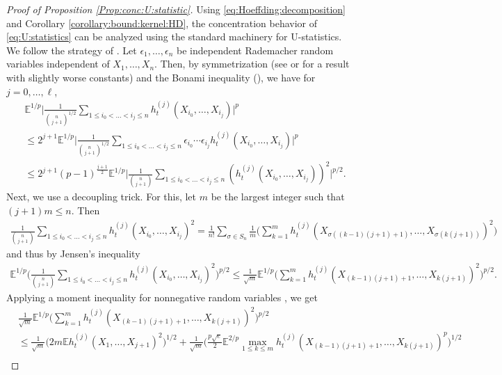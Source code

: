 \documentclass[10pt]{article}
\theoremstyle{plain}
\theoremstyle{definition}
\theoremstyle{remark}
\begin{document}
\begin{proof}[Proof of Proposition \ref{Prop:conc:U:statistic}]
    Using \eqref{eq:Hoeffding:decomposition} and Corollary \ref{corollary:bound:kernel:HD}, the concentration behavior of \eqref{eq:U:statistics} can be analyzed using the standard machinery for U-statistics. We follow the strategy of \cite{Mins24}. Let $\epsilon_1,\dots,\epsilon_n$ be independent Rademacher random variables independent of $X_1,\dots,X_n$. Then, by symmetrization (see \cite{SCK19} or \cite[Theorem 3.1]{PG99} for a result with slightly worse constants) and the Bonami inequality (\cite[Theorem 3.22]{PG99}), we have for $j=0,\dots,\ell$, 
    \begin{align*}
        &\mathbb{E}^{1/p}\Big|\frac{1}{\binom{n}{j+1}^{1/2}}\sum_{1\leq i_0<\dots<i_j\leq n}h_t^{(j)}(X_{i_0},\dots,X_{i_j})\Big|^p\\
        &\leq 2^{j+1}\mathbb{E}^{1/p}\Big|\frac{1}{\binom{n}{j+1}^{1/2}}\sum_{1\leq i_0<\dots<i_j\leq n}\epsilon_{i_0}\cdots\epsilon_{i_j}h_t^{(j)}(X_{i_0},\dots,X_{i_j})\Big|^p\\
        &\leq 2^{j+1}(p-1)^{\frac{j+1}{2}}\mathbb{E}^{1/p}\Big|\frac{1}{\binom{n}{j+1}}\sum_{1\leq i_0<\dots<i_j\leq n}(h_t^{(j)}(X_{i_0},\dots,X_{i_j}))^2\Big|^{p/2}.
    \end{align*}
    Next, we use a decoupling trick. For this, let $m$ be the largest integer such that $(j+1)m\leq n$. Then 
    \begin{align*}
        \frac{1}{\binom{n}{j+1}}\sum_{1\leq i_0<\dots<i_j\leq n}h_t^{(j)}(X_{i_0},\dots,X_{i_j})^2=\frac{1}{n!}\sum_{\sigma\in S_n}\frac{1}{m}\Big(\sum_{k=1}^m h_t^{(j)}(X_{\sigma((k-1)(j+1)+1)},\dots,X_{\sigma(k(j+1))})^2\Big)
    \end{align*}
    and thus by Jensen's inequality 
    \begin{align*}
        \mathbb{E}^{1/p}\Big(\frac{1}{\binom{n}{j+1}}\sum_{1\leq i_0<\dots<i_j\leq n}h_t^{(j)}(X_{i_0},\dots,X_{i_j})^2\Big)^{p/2}\leq \frac{1}{\sqrt{m}}\mathbb{E}^{1/p}\Big(\sum_{k=1}^m h_t^{(j)}(X_{(k-1)(j+1)+1},\dots,X_{k(j+1)})^2\Big)^{p/2}.
    \end{align*}
    Applying a moment inequality for nonnegative random variables \cite[Theorem 15.10]{BLM13}, we get
    \begin{align*}
        &\frac{1}{\sqrt{m}}\mathbb{E}^{1/p}\Big(\sum_{k=1}^mh_t^{(j)}(X_{(k-1)(j+1)+1},\dots,X_{k(j+1)})^2\Big)^{p/2}\\
        & \leq \frac{1}{\sqrt{m}}\Big(2m\mathbb{E}h_t^{(j)}(X_{1},\dots,X_{j+1})^2\Big)^{1/2}+\frac{1}{\sqrt{m}}\Big(\frac{p\sqrt{e}}{2}\mathbb{E}^{2/p}\max_{1\leq k\leq m}h_t^{(j)}(X_{(k-1)(j+1)+1},\dots,X_{k(j+1)})^p\Big)^{1/2}\\

\end{align*}
\end{proof}
\end{document}
